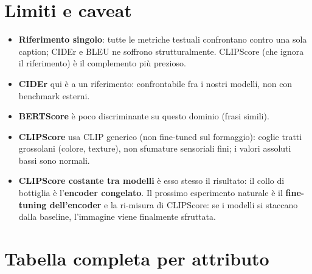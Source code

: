 \documentclass[11pt,a4paper]{article}
\begin{document}
\section{Limiti e caveat}
\begin{itemize}
\item \textbf{Riferimento singolo}: tutte le metriche testuali confrontano contro
una sola caption; CIDEr e BLEU ne soffrono strutturalmente. CLIPScore (che ignora
il riferimento) è il complemento più prezioso.
\item \textbf{CIDEr} qui è a un riferimento: confrontabile fra i nostri modelli,
non con benchmark esterni.
\item \textbf{BERTScore} è poco discriminante su questo dominio (frasi simili).
\item \textbf{CLIPScore} usa CLIP generico (non fine-tuned sul formaggio): coglie
tratti grossolani (colore, texture), non sfumature sensoriali fini; i valori
assoluti bassi sono normali.
\item \textbf{CLIPScore costante tra modelli} è esso stesso il risultato: il collo
di bottiglia è l'\textbf{encoder congelato}. Il prossimo esperimento naturale è il
\textbf{fine-tuning dell'encoder} e la ri-misura di CLIPScore: se i modelli si
staccano dalla baseline, l'immagine viene finalmente sfruttata.
\end{itemize}

\appendix
\section{Tabella completa per attributo}
\end{document}
